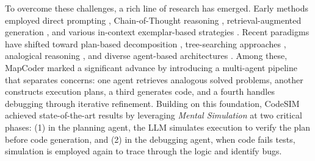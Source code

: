 \documentclass[11pt]{article}
\begin{document}
To overcome these challenges, a rich line of research has emerged. Early methods employed direct prompting \citep{chen2021evaluating}, Chain-of-Thought reasoning \citep{wei2022chain}, retrieval-augmented generation \citep{parvez2021retrieval}, and various in-context exemplar-based strategies \citep{zhang2022automatic, shum2023automatic}. Recent paradigms have shifted toward plan-based decomposition \citep{jiang2023self}, tree-searching approaches \citep{zhou2023language}, analogical reasoning \citep{yasunaga2023large}, and diverse agent-based architectures \citep{shinn2023reflexion, qian2024chatdev}. Among these, MapCoder \citep{islam2024mapcoder} marked a significant advance by introducing a multi-agent pipeline that separates concerns: one agent retrieves analogous solved problems, another constructs execution plans, a third generates code, and a fourth handles debugging through iterative refinement. Building on this foundation, CodeSIM \citep{islam2025codesim} achieved state-of-the-art results by leveraging \textit{Mental Simulation} at two critical phases: (1) in the planning agent, the LLM simulates execution to verify the plan before code generation, and (2) in the debugging agent, when code fails tests, simulation is employed again to trace through the logic and identify bugs.
\end{document}
